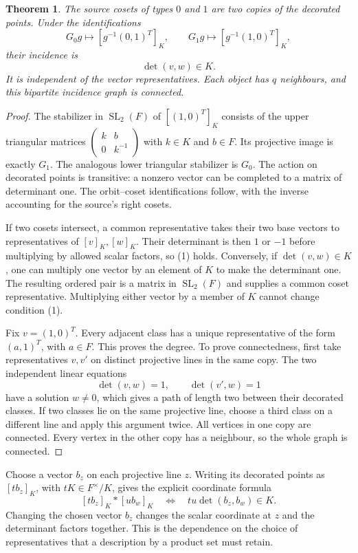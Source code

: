 \documentclass[11pt,a4paper]{article}
\newtheorem{theorem}{Theorem}
\begin{document}
\begin{theorem}\label{incidence}
The source cosets of types $0$ and $1$ are two copies of the
decorated points. Under the identifications
\[
 G_0g\longmapsto[g^{-1}(0,1)^T]_K,
 \qquad G_1g\longmapsto[g^{-1}(1,0)^T]_K,
\]
their incidence is
\[
                         \det(v,w)\in K.                 \tag{1}
\]
It is independent of the vector representatives. Each object has
$q$ neighbours, and this bipartite incidence graph is connected.
\end{theorem}
\begin{proof}
The stabilizer in $\operatorname{SL}_2(F)$ of $[(1,0)^T]_K$
consists of the upper triangular matrices
$\left(\begin{smallmatrix}k&b\\0&k^{-1}\end{smallmatrix}\right)$
with $k\in K$ and $b\in F$. Its projective image is exactly $G_1$.
The analogous lower triangular stabilizer is $G_0$.
The action on decorated points is transitive: a nonzero vector can
be completed to a matrix of determinant one. The orbit--coset
identifications follow, with the inverse accounting for the source's
right cosets.

If two cosets intersect, a common representative takes their two
base vectors to representatives of $[v]_K,[w]_K$. Their determinant
is then $1$ or $-1$ before multiplying by allowed scalar factors,
so (1) holds. Conversely, if $\det(v,w)\in K$, one can multiply
one vector by an element of $K$ to make the determinant one.
The resulting ordered pair is a matrix in $\operatorname{SL}_2(F)$
and supplies a common coset representative. Multiplying either
vector by a member of $K$ cannot change condition (1).

Fix $v=(1,0)^T$. Every adjacent class has a unique representative
of the form $(a,1)^T$, with $a\in F$. This proves the degree.
To prove connectedness, first take representatives $v,v'$ on
distinct projective lines in the same copy. The two independent
linear equations
\[
                  \det(v,w)=1,\qquad\det(v',w)=1
\]
have a solution $w\ne0$, which gives a path of length two between
their decorated classes. If two classes lie on the same projective
line, choose a third class on a different line and apply this argument
twice. All vertices in one copy are connected. Every vertex in the
other copy has a neighbour, so the whole graph is connected.
\end{proof}

Choose a vector $b_z$ on each projective line $z$. Writing its
decorated points as $[t b_z]_K$, with $tK\in F^\times/K$, gives
the explicit coordinate formula
\[
 [t b_z]_K * [u b_w]_K
 \quad\Longleftrightarrow\quad
             t u\det(b_z,b_w)\in K.                      \tag{2}
\]
Changing the chosen vector $b_z$ changes the scalar coordinate at
$z$ and the determinant factors together. This is the dependence
on the choice of representatives that a description by a product
set must retain.
\end{document}

